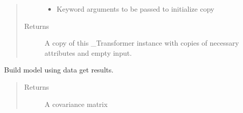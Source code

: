 \documentclass[letterpaper,10pt,english]{sphinxmanual}
\begin{document}
\begin{fulllineitems}
\begin{fulllineitems}
\begin{quote}
\begin{description}
\begin{itemize}
\item {} 
 \textendash{} Keyword arguments to be passed to initialize copy

\end{itemize}

\item[{Returns}] \leavevmode
A copy of this \_Transformer instance with copies of necessary
attributes and empty input.

\end{description}\end{quote}

\end{fulllineitems}


\begin{fulllineitems}
\end{fulllineitems}


\begin{fulllineitems}
\label{\detokenize{dalio.pipe:dalio.pipe.CovShrink.transform}}
Build model using data get results.
\begin{quote}\begin{description}
\item[{Returns}] \leavevmode
A covariance matrix

\end{description}\end{quote}

\end{fulllineitems}


\end{fulllineitems}

\end{document}
